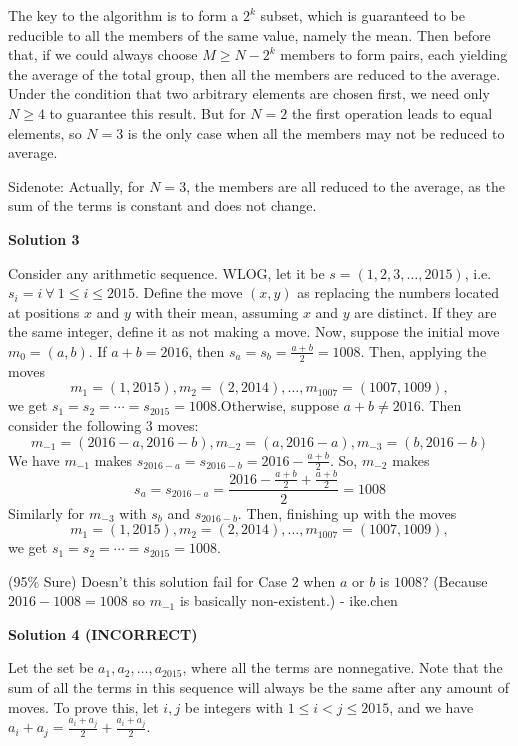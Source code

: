 \begin{enumerate}
 The key to the algorithm is to form a $2^k$ subset, which is guaranteed to be reducible to all the members of the same value, namely the mean. Then before that, if we could always choose $M\ge N-2^k$ members to form pairs, each yielding the average of the total group, then all the members are reduced to the average. Under the condition that two arbitrary elements are chosen first, we need only $N\ge4$ to guarantee this result. But for $N=2$ the first operation leads to equal elements, so $N=3$ is the only case when all the members may not be reduced to average.

 Sidenote: Actually, for $N=3$, the members are all reduced to the average, as the sum of the terms is constant and does not change.

 



\textbf{Solution 3}

Consider any arithmetic sequence. WLOG, let it be $s = (1, 2, 3, \dots, 2015)$, i.e. $s_i = i\ \forall\ 1\le i\le 2015$. Define the move $(x, y)$ as replacing the numbers located at positions $x$ and $y$ with their mean, assuming $x$ and $y$ are distinct. If they are the same integer, define it as not making a move. Now, suppose the initial move $m_0 = (a, b)$. If $a+b=2016$, then $s_a = s_b = \frac{a+b}{2} = 1008$. Then, applying the moves
 \[m_1 = (1, 2015), m_2 = (2, 2014), \dots, m_{1007} = (1007, 1009),\]we get $s_1 = s_2 = \cdots = s_{2015} = 1008$.Otherwise, suppose $a+b\ne 2016$. Then consider the following $3$ moves:
 \[m_{-1} = (2016-a, 2016-b), m_{-2} = (a, 2016-a), m_{-3} = (b, 2016-b)\]We have $m_{-1}$ makes $s_{2016-a} = s_{2016-b} = 2016 - \frac{a+b}{2}$. So, $m_{-2}$ makes
 \[s_a = s_{2016-a} = \frac{2016 - \frac{a+b}{2} + \frac{a+b}{2}}{2} = 1008\]Similarly for $m_{-3}$ with $s_b$ and $s_{2016-b}$. Then, finishing up with the moves
 \[m_1 = (1, 2015), m_2 = (2, 2014), \dots, m_{1007} = (1007, 1009),\]we get $s_1 = s_2 = \cdots = s_{2015} = 1008$.

 


 (95\% Sure) Doesn't this solution fail for Case $2$ when $a$ or $b$ is $1008$? (Because $2016-1008 = 1008$ so $m_{-1}$ is basically non-existent.) - ike.chen

 



\textbf{Solution 4 (INCORRECT)}

Let the set be ${a_1,a_2,\dots ,a_{2015}}$, where all the terms are nonnegative. Note that the sum of all the terms in this sequence will always be the same after any amount of moves. To prove this, let $i,j$ be integers with $1\le i<j\le 2015$, and we have $a_i+a_j = \frac{a_i+a_j}{2}+\frac{a_i+a_j}{2}$.


\end{enumerate}
